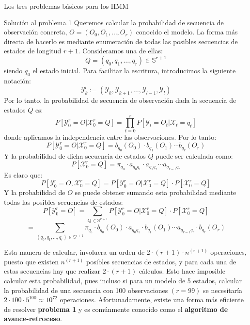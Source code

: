 \begin{section}{Los tres problemas básicos para los HMM}
\begin{subsection}{Solución al problema 1}
Queremos calcular la probabilidad de secuencia de observación concreta, $O=(O_0,O_1,\dots, O_r)$ conocido el modelo. La forma más directa de hacerlo es mediante enumeración de todas las posibles secuencias de estados de longitud $r+1$. Consideramos una de ellas:
\[Q=(q_0 , q_1 , \dots , q_r)\in\mathbb{S}^{r+1}\]
siendo $q_0$ el estado inicial. Para facilitar la escritura, introducimos la siguiente notación:
\[\mathcal{Y}_k^l:=(\mathcal{Y}_{k},\mathcal{Y}_{k+1},\dots,\mathcal{Y}_{l-1},\mathcal{Y}_{l})\]
Por lo tanto, la probabilidad de secuencia de observación dada la secuencia de estados $Q$ es:
\[P[\mathcal{Y}_0^r=O|\mathcal{X}_0^r=Q]=\prod_{t=0}^r P[\mathcal{Y}_{t}=O_t|\mathcal{X}_{t}=q_t]\]
donde aplicamos la independencia entre las observaciones. Por lo tanto:
\[P[\mathcal{Y}_0^r=O|\mathcal{X}_0^r=Q]=b_{q_0}(O_0)\cdot b_{q_1}(O_1)\cdots b_{q_r}(O_r)\]
Y la probabilidad de dicha secuencia de estados $Q$ puede ser calculada como:
\[P[\mathcal{X}_0^r=Q]=\pi_{q_0}\cdot a_{q_0q_1}\cdot a_{q_1q_2}\cdots a_{q_{r-1}q_r} \]
Es claro que:
\[P[\mathcal{Y}_0^r=O,\mathcal{X}_0^r=Q]=P[\mathcal{Y}_0^r=O|\mathcal{X}_0^r=Q]\cdot P[\mathcal{X}_0^r=Q] \]
Y la probabilidad de $O$ se puede obtener sumando esta probabilidad mediante todas las posibles secuencias de estados:
\[P[\mathcal{Y}_0^r=O]=\sum_{Q\in\mathbb{S}^{r+1}}P[\mathcal{Y}_0^r=O|\mathcal{X}_0^r=Q]\cdot P[\mathcal{X}_0^r=Q]\]
\[=\sum_{(q_0 , q_1 , \dots , q_r)\in\mathbb{S}^{r+1}}\pi_{q_0}\cdot b_{q_0}(O_0)\cdot a_{q_0q_1}\cdot b_{q_1}(O_1)\cdots a_{q_{r-1}q_r}\cdot b_{q_r}(O_r)\]

Esta manera de calcular, involucra un orden de $2\cdot(r+1)\cdot n^{(r+1)}$ operaciones, puesto que existen $n^{(r+1)}$ posibles secuencias de estados, y para cada una de estas secuencias hay que realizar $2\cdot(r+1)$ cálculos. Esto hace imposible calcular esta probabilidad, pues incluso si para un modelo de 5 estados, calcular la probabilidad de una secuencia con 100 observaciones $(r=99)$ se necesitaría $2\cdot100\cdot5^{100}\approx10^{72}$ operaciones. Afortunadamente, existe una forma más eficiente de resolver \textbf{problema 1} y es comúnmente conocido como el \textbf{algoritmo de avance-retroceso}. 


\end{subsection}
\end{section}
